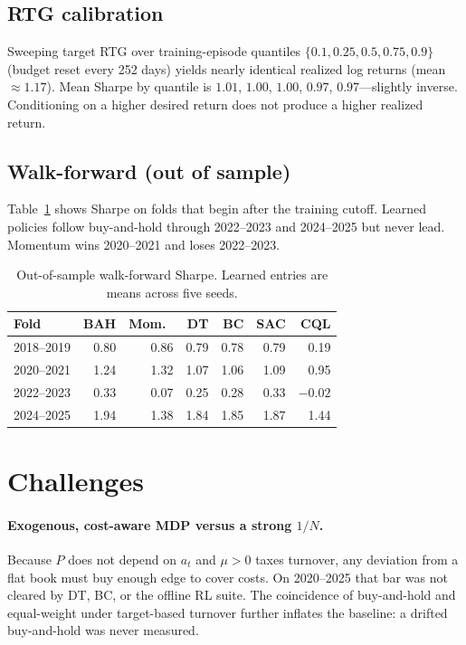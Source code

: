 \documentclass[11pt]{article}
\begin{document}
\subsection{RTG calibration}
Sweeping target RTG over training-episode quantiles $\{0.1,0.25,0.5,0.75,0.9\}$ (budget reset every 252 days) yields nearly identical realized log returns (mean $\approx 1.17$). Mean Sharpe by quantile is $1.01$, $1.00$, $1.00$, $0.97$, $0.97$---slightly inverse. Conditioning on a higher desired return does not produce a higher realized return.

\subsection{Walk-forward (out of sample)}
Table~\ref{tab:wf} shows Sharpe on folds that begin after the training cutoff. Learned policies follow buy-and-hold through 2022--2023 and 2024--2025 but never lead. Momentum wins 2020--2021 and loses 2022--2023.

\begin{table}[h]
\centering
\caption{Out-of-sample walk-forward Sharpe. Learned entries are means across five seeds.}
\label{tab:wf}
\begin{tabular}{lrrrrrr}
\toprule
Fold & BAH & Mom.\ & DT & BC & SAC & CQL \\
\midrule
2018--2019 & 0.80 & 0.86 & 0.79 & 0.78 & 0.79 & 0.19 \\
2020--2021 & 1.24 & 1.32 & 1.07 & 1.06 & 1.09 & 0.95 \\
2022--2023 & 0.33 & 0.07 & 0.25 & 0.28 & 0.33 & $-0.02$ \\
2024--2025 & 1.94 & 1.38 & 1.84 & 1.85 & 1.87 & 1.44 \\
\bottomrule
\end{tabular}
\end{table}

\section{Challenges}
\label{sec:challenges}

\paragraph{Exogenous, cost-aware MDP versus a strong $1/N$.}
Because $P$ does not depend on $a_t$ and $\mu>0$ taxes turnover, any deviation from a flat book must buy enough edge to cover costs. On 2020--2025 that bar was not cleared by DT, BC, or the offline RL suite. The coincidence of buy-and-hold and equal-weight under target-based turnover further inflates the baseline: a drifted buy-and-hold was never measured.
\end{document}
